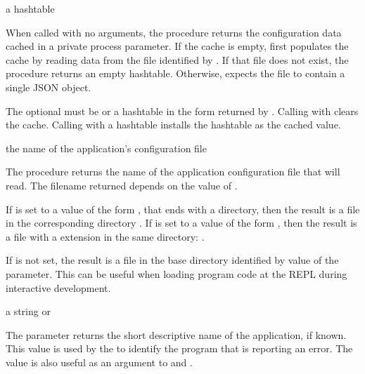 \begin{procedure}
\end{procedure}
\returns{} a hashtable

When called with no arguments, the  procedure
returns the configuration data cached in a private process parameter.
If the cache is empty,  first populates the cache by reading
data from the file identified by .
If that file does not exist, the procedure returns an empty hashtable.
Otherwise,  expects the file to contain a single JSON object.

The optional  must be  or a hashtable in the form returned by
.
Calling  with  clears the cache.
Calling  with a hashtable installs the hashtable as the cached value.

\begin{procedure}
\end{procedure}
\returns{} the name of the application's configuration file

The  procedure returns the name of the application
configuration file that  will read.
The filename returned depends on the value of .

If  is set to a value of the form
,
that ends with a  directory,
then the result is a  file in the corresponding  directory
.
If  is set to a value of the form
,
then the result is a file with a  extension in the same directory:
.

If  is not set, the result is a  file in the base
directory identified by value of the  parameter.
This can be useful when loading program code at the REPL during interactive
development.

\begin{parameter}
\end{parameter}
\hasvalue{} a string or 

The  parameter returns the short descriptive name of the
application, if known.
This value is used by the  to identify the program
that is reporting an error.
The value is also useful as an argument to  and
.

